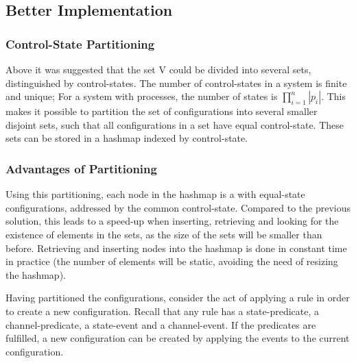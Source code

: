 \newpage
\subsection{Better Implementation}
\subsubsection{Control-State Partitioning}
Above it was suggested that the set V could be divided into several sets, distinguished by control-states. The number of control-states in a system is finite and unique; For a system with  processes, the number of states is $\prod\limits_{i=1}^n|p_i|$. This makes it possible to partition the set of configurations into several smaller disjoint sets, such that all configurations in a set have equal control-state. These sets can be stored in a hashmap indexed by control-state.



\subsubsection{Advantages of Partitioning}
Using this partitioning, each node in the hashmap is a  with equal-state configurations, addressed by the common control-state. Compared to the previous solution, this leads to a speed-up when inserting, retrieving and looking for the existence of elements in the sets, as the size of the sets will be smaller than before. Retrieving and inserting nodes into the hashmap is done in constant time in practice (the number of elements will be static, avoiding the need of resizing the hashmap).

Having partitioned the configurations, consider the act of applying a rule in order to create a new configuration. Recall that any rule has a state-predicate, a channel-predicate, a state-event and a channel-event. If the predicates are fulfilled, a new configuration can be created by applying the events to the current configuration.

